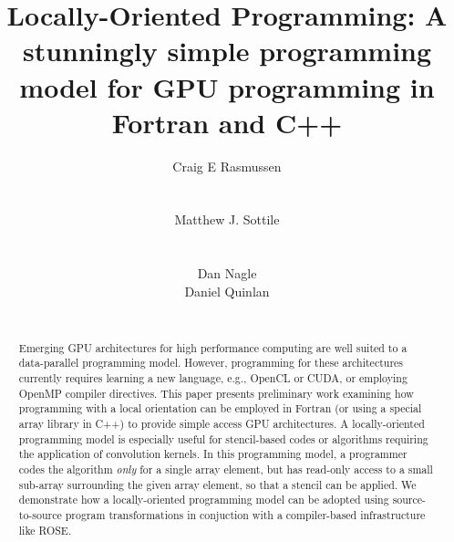 \documentclass{acm_proc_article-sp}
\begin{document}
\title{Locally-Oriented Programming: A stunningly simple programming model for GPU programming in Fortran and C++}


\author{
\alignauthor
Craig E Rasmussen\\
       \\
       \\
\alignauthor
Matthew J. Sottile\\
       \\
       \\
\alignauthor
Dan Nagle\\
\alignauthor
Daniel Quinlan\\
       \\
}

\maketitle

\begin{abstract}
Emerging GPU architectures for high performance computing are well suited to a
data-parallel programming model.  However, programming for these architectures
currently requires learning a new language, e.g., OpenCL or CUDA, or employing
OpenMP compiler directives.  This paper presents preliminary work examining how
programming with a local orientation can be employed in Fortran (or using a
special array library in C++) to provide simple access GPU architectures.  A
locally-oriented programming model is especially useful for stencil-based codes
or algorithms requiring the application of convolution kernels.  In this
programming model, a programmer codes the algorithm {\it only} for a single
array element, but has read-only access to a small sub-array surrounding the
given array element, so that a stencil can be applied.  We demonstrate how a
locally-oriented programming model can be adopted using source-to-source program
transformations in conjuction with a compiler-based infrastructure like ROSE.
\end{abstract}
\end{document}

